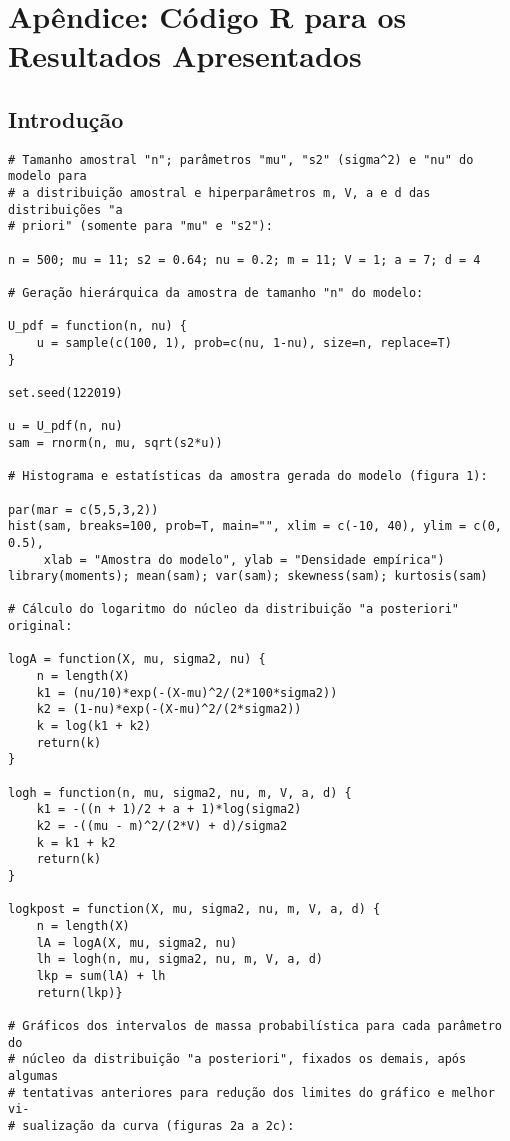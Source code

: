 \section*{Apêndice: Código R para os Resultados Apresentados}

\subsection*{Introdução}

\begin{verbatim}
# Tamanho amostral "n"; parâmetros "mu", "s2" (sigma^2) e "nu" do modelo para
# a distribuição amostral e hiperparâmetros m, V, a e d das distribuições "a
# priori" (somente para "mu" e "s2"):

n = 500; mu = 11; s2 = 0.64; nu = 0.2; m = 11; V = 1; a = 7; d = 4

# Geração hierárquica da amostra de tamanho "n" do modelo:

U_pdf = function(n, nu) {
	u = sample(c(100, 1), prob=c(nu, 1-nu), size=n, replace=T)
}

set.seed(122019)

u = U_pdf(n, nu)
sam = rnorm(n, mu, sqrt(s2*u))

# Histograma e estatísticas da amostra gerada do modelo (figura 1):

par(mar = c(5,5,3,2))
hist(sam, breaks=100, prob=T, main="", xlim = c(-10, 40), ylim = c(0, 0.5),
	 xlab = "Amostra do modelo", ylab = "Densidade empírica")
library(moments); mean(sam); var(sam); skewness(sam); kurtosis(sam)

# Cálculo do logaritmo do núcleo da distribuição "a posteriori" original:

logA = function(X, mu, sigma2, nu) {
	n = length(X)
	k1 = (nu/10)*exp(-(X-mu)^2/(2*100*sigma2))
	k2 = (1-nu)*exp(-(X-mu)^2/(2*sigma2))
	k = log(k1 + k2)
	return(k)
}

logh = function(n, mu, sigma2, nu, m, V, a, d) {
	k1 = -((n + 1)/2 + a + 1)*log(sigma2)
	k2 = -((mu - m)^2/(2*V) + d)/sigma2
	k = k1 + k2
	return(k)
}

logkpost = function(X, mu, sigma2, nu, m, V, a, d) {
	n = length(X)
	lA = logA(X, mu, sigma2, nu)
	lh = logh(n, mu, sigma2, nu, m, V, a, d)
	lkp = sum(lA) + lh
	return(lkp)}

# Gráficos dos intervalos de massa probabilística para cada parâmetro do
# núcleo da distribuição "a posteriori", fixados os demais, após algumas
# tentativas anteriores para redução dos limites do gráfico e melhor vi-
# sualização da curva (figuras 2a a 2c):


\end{verbatim}
